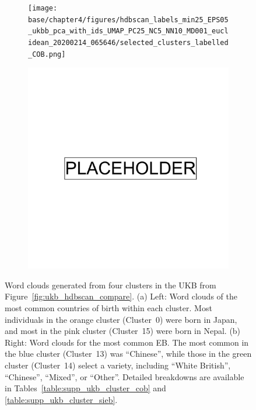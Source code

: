 \begin{figure}[ht]
  \centering
  \begin{subfigure}[b]{0.45\linewidth}
    \texttt{[image: base/chapter4/figures/hdbscan\_labels\_min25\_EPS05\_ukbb\_pca\_with\_ids\_UMAP\_PC25\_NC5\_NN10\_MD001\_euclidean\_20200214\_065646/selected\_clusters\_labelled\_COB.png]}
    \caption{}
    \label{fig:supp_ukb_hdbscan_top1}
  \end{subfigure}
  \begin{subfigure}[b]{0.45\linewidth}
        \includegraphics[width=\linewidth]{placeholder.png}
    \caption{}
    \label{fig:supp_ukb_hdbscan_top2}
  \end{subfigure}
  \caption[Word clouds generated from four clusters in the UKB]{Word clouds generated from four clusters in the UKB from Figure~\ref{fig:ukb_hdbscan_compare}. (a) Left: Word clouds of the most common countries of birth within each cluster. Most individuals in the orange cluster (Cluster~0) were born in Japan, and most in the pink cluster (Cluster~15) were born in Nepal. (b) Right: Word clouds for the most common EB. The most common in the blue cluster (Cluster~13) was ``Chinese'', while those in the green cluster (Cluster~14) select a variety, including ``White British'', ``Chinese'', ``Mixed'', or ``Other''. Detailed breakdowns are available in Tables~\ref{table:supp_ukb_cluster_cob} and \ref{table:supp_ukb_cluster_sieb}.}
  \label{fig:supp_ukb_hdbscan_top}
\end{figure}


